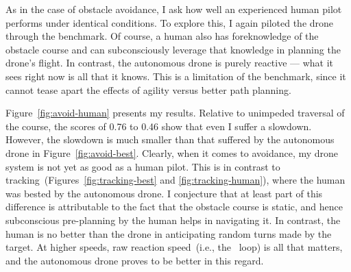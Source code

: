 As in the case of obstacle avoidance, I ask how well an experienced
human pilot performs under identical conditions. To
explore this, I again piloted the drone through the benchmark. Of course, a human also
has foreknowledge of the obstacle course and can subconsciously
leverage that knowledge in planning the drone's flight.  In contrast,
the autonomous drone is purely reactive --- what it sees right now is
all that it knows. This is a limitation of the benchmark, since it cannot tease apart the effects of agility versus better path planning.

Figure~\ref{fig:avoid-human} presents my results.  Relative to
unimpeded traversal of the course, the scores of 0.76 to 0.46 show
that even I suffer a slowdown.  However, the slowdown is much
smaller than that suffered by the autonomous drone in
Figure~\ref{fig:avoid-best}. Clearly, when it comes to avoidance, my drone system is not yet as good as a human pilot. This is in contrast to tracking~(Figures~\ref{fig:tracking-best} and \ref{fig:tracking-human}),
where the human was bested by the autonomous drone.  I
conjecture that at least part of this difference is attributable to
the fact that the obstacle course is static, and hence subconscious
pre-planning by the human helps in navigating it.  In contrast, the
human is no better than the drone in anticipating random turns made by
the target.  At higher speeds, raw reaction speed~(i.e., the
\ooda~loop) is all that matters, and the autonomous drone proves to be
better in this regard.

